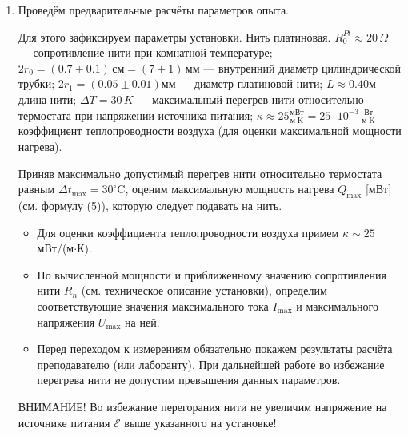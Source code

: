 \documentclass[a4paper,12pt]{article} %
\begin{document}
\begin{enumerate}
    \item Проведём предварительные расчёты параметров опыта. 
    
    Для этого зафиксируем параметры установки. Нить платиновая.
    $R^{Pt}_0 \approx 20 \, \Omega$ — сопротивление нити при комнатной температуре; \\
    $2r_0 = (0.7 \pm 0.1) \, \text{см} = (7 \pm 1) \, \text{мм}$ — внутренний диаметр цилиндрической трубки;
    $2r_1 = (0.05 \pm 0.01) \text{мм}$ — диаметр платиновой нити;
    $L \approx 0.40 м$ — длина нити;
    $\Delta T = 30 \, K$ — максимальный перегрев нити относительно термостата при напряжении источника питания;
    $\kappa \approx 25 \frac{\text{мВт}}{\text{м}\cdot\text{K}} = 25 \cdot 10^{-3} \, \frac{\text{Вт}}{\text{м}\cdot\text{K}}$ — коэффициент теплопроводности воздуха (для оценки максимальной мощности нагрева). 


    
    Приняв максимально допустимый перегрев нити относительно термостата равным $\Delta t_{\text{max}} = 30^\circ$C, оценим максимальную мощность нагрева $Q_{\text{max}}$ [мВт] (см. формулу (5)), которую следует подавать на нить. 
\begin{itemize}
  \item Для оценки коэффициента теплопроводности воздуха примем $\kappa \sim 25$ мВт/(м$\cdot$К).
  \item По вычисленной мощности и приближенному значению сопротивления нити $R_n$ (см. техническое описание установки), определим соответствующие значения максимального тока $I_{\text{max}}$ и максимального напряжения $U_{\text{max}}$ на ней. 
  \item Перед переходом к измерениям обязательно покажем результаты расчёта преподавателю (или лаборанту). При дальнейшей работе во избежание перегрева нити не допустим превышения данных параметров.
\end{itemize}
  
  ВНИМАНИЕ! Во избежание перегорания нити не увеличим напряжение на источнике питания $\mathcal{E}$ выше указанного на установке!


\end{enumerate}
\end{document}
